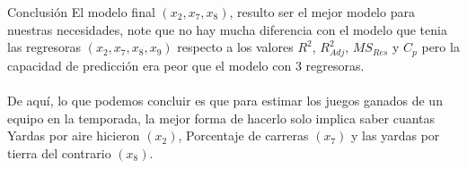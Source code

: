 \documentclass[11pt]{beamer}
\begin{document}
\begin{frame}
\tableofcontents[currentsection]
\end{frame}

\begin{frame}{Conclusión}
El modelo final $(x_{2},x_{7},x_{8})$, resulto ser el mejor modelo para nuestras necesidades, note que no hay mucha diferencia con el modelo que tenia las regresoras $(x_{2},x_{7},x_{8},x_{9})$ respecto a los valores $R^{2}$, $R^{2}_{Adj}$, $MS_{Res}$ y $C_{p}$ pero la capacidad de predicción era peor que el modelo con 3 regresoras.\\~\\

De aquí, lo que podemos concluir es que para estimar los juegos ganados de un equipo en la temporada, la mejor forma de hacerlo solo implica saber cuantas Yardas por aire hicieron $(x_{2})$, Porcentaje de carreras $(x_{7})$ y las yardas por tierra del contrario $(x_{8})$.
\end{frame}
\end{document}
